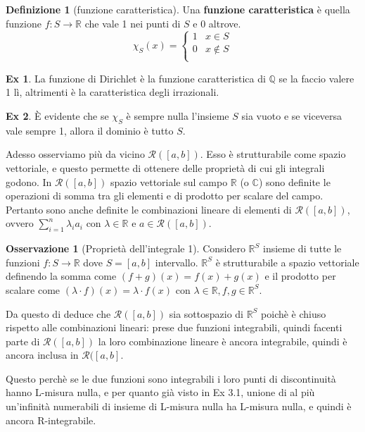 \documentclass{article}
\theoremstyle{definition}
\theoremstyle{definition}
\theoremstyle{definition}
\newtheorem{definition}{Definizione}[section]
\theoremstyle{definition}
\newtheorem{remark}{Osservazione}[section]
\theoremstyle{definition}
\newtheorem{example}{Ex}[section]
\theoremstyle{definition}
\begin{document}
\begin{definition}[funzione caratteristica]
    Una \textbf{funzione caratteristica} è quella funzione $f:S\rightarrow \mathbb{R}$ che vale 1 nei punti di $S$ e 0 altrove.
    \[
        \chi_S(x) = \begin{cases}
            1 & x\in S \\
            0 & x \notin S \\
        \end{cases}
    \]
\end{definition}

\begin{example}
    La funzione di Dirichlet è la funzione caratteristica di $\mathbb{Q}$ se la faccio valere 1 lì, altrimenti è la caratteristica degli irrazionali.
\end{example}

\begin{example}
    È evidente che se $\chi_S$ è sempre nulla l'insieme $S$ sia vuoto e se viceversa vale sempre 1, allora il dominio è tutto $S$.
\end{example}

Adesso osserviamo più da vicino $\mathcal{R}([a,b])$. Esso è strutturabile come spazio vettoriale, e questo permette di ottenere delle proprietà di cui gli integrali godono. In $\mathcal{R}([a,b])$ spazio vettoriale sul campo $\mathbb{R}$ (o $\mathbb{C}$) sono definite le operazioni di somma tra gli elementi e di prodotto per scalare del campo. Pertanto sono anche definite le combinazioni lineare di elementi di $\mathcal{R}([a,b])$, ovvero $\displaystyle\sum_{i=1}^{n}\lambda_ia_i$ con $\lambda \in \mathbb{R}$ e $a\in \mathcal{R}([a,b])$.

\vspace{3mm}

\begin{remark}[Proprietà dell'integrale 1]
    Considero $\mathbb{R}^S$ insieme di tutte le funzioni $f:S\rightarrow \mathbb{R}$ dove $S=[a,b]$ intervallo. $\mathbb{R}^S$ è strutturabile a spazio vettoriale definendo la somma come $(f+g)(x)=f(x)+g(x)$ e il prodotto per scalare come $(\lambda\cdot f)(x)=\lambda \cdot f(x)$ con $\lambda\in\mathbb{R}, f,g\in\mathbb{R}^S$.

    Da questo di deduce che $\mathcal{R}([a,b])$ sia sottospazio di $\mathbb{R}^S$ poichè è chiuso rispetto alle combinazioni lineari: prese due funzioni integrabili, quindi facenti parte di $\mathcal{R}([a,b])$ la loro combinazione lineare è ancora integrabile, quindi è ancora inclusa in $\mathcal{R}([a,b]$.

    Questo perchè se le due funzioni sono integrabili i loro punti di discontinuità hanno L-misura nulla, e per quanto già visto in Ex 3.1, unione di al più un'infinità numerabili di insieme di L-misura nulla ha L-misura nulla, e quindi è ancora R-integrabile.
\end{remark}
\end{document}
